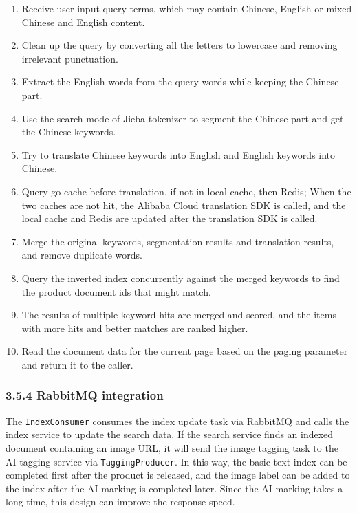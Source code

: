 \documentclass{article}
\begin{document}
\begin{enumerate}
    \item Receive user input query terms, which may contain Chinese, English or mixed Chinese and English content.
    \item Clean up the query by converting all the letters to lowercase and removing irrelevant punctuation.
    \item Extract the English words from the query words while keeping the Chinese part.
    \item Use the search mode of Jieba tokenizer to segment the Chinese part and get the Chinese keywords.
    \item Try to translate Chinese keywords into English and English keywords into Chinese.
    \item Query go-cache before translation, if not in local cache, then Redis; When the two caches are not hit, the Alibaba Cloud translation SDK is called, and the local cache and Redis are updated after the translation SDK is called.
    \item Merge the original keywords, segmentation results and translation results, and remove duplicate words.
    \item Query the inverted index concurrently against the merged keywords to find the product document ids that might match.
    \item The results of multiple keyword hits are merged and scored, and the items with more hits and better matches are ranked higher.
    \item Read the document data for the current page based on the paging parameter and return it to the caller.
\end{enumerate}

\subsubsection{3.5.4 RabbitMQ integration}

The \texttt{IndexConsumer} consumes the index update task via RabbitMQ and calls the index service to update the search data. If the search service finds an indexed document containing an image URL, it will send the image tagging task to the AI tagging service via \texttt{TaggingProducer}. In this way, the basic text index can be completed first after the product is released, and the image label can be added to the index after the AI marking is completed later. Since the AI marking takes a long time, this design can improve the response speed.
\end{document}
